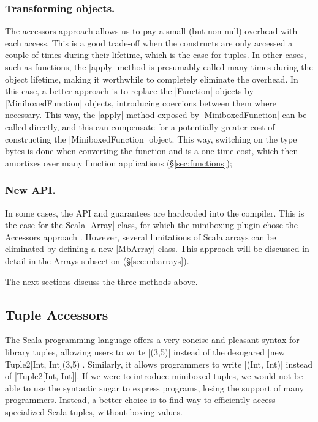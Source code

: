 \subsubsection{Transforming objects.} The accessors approach allows us to pay a small (but non-null) overhead with each access. This is a good trade-off when the constructs are only accessed a couple of times during their lifetime, which is the case for tuples. In other cases, such as functions, the |apply| method is presumably called many times during the object lifetime, making it worthwhile to completely eliminate the overhead. In this case, a better approach is to replace the |Function| objects by |MiniboxedFunction| objects, introducing coercions between them where necessary. This way, the |apply| method exposed by |MiniboxedFunction| can be called directly, and this can compensate for a potentially greater cost of constructing the |MiniboxedFunction| object. This way, switching on the type bytes is done when converting the function and is a one-time cost, which then amortizes over many function applications (\S\ref{sec:functions});

\subsubsection{New API.} In some cases, the API and guarantees are hardcoded into the compiler. This is the case for the Scala |Array| class, for which the miniboxing plugin chose the Accessors approach \cite{miniboxing}. However, several limitations of Scala arrays can be eliminated by defining a new |MbArray| class. This approach will be discussed in detail in the Arrays subsection (\S\ref{sec:mbarrays}).

The next sections discuss the three methods above.

\subsection{Tuple Accessors}
\label{sec:tuples}

The Scala programming language offers a very concise and pleasant syntax for library tuples, allowing users to write |(3,5)| instead of the desugared |new Tuple2[Int, Int](3,5)|. Similarly, it allows programmers to write |(Int, Int)| instead of |Tuple2[Int, Int]|. If we were to introduce miniboxed tuples, we would not be able to use the syntactic sugar to express programs, losing the support of many programmers. Instead, a better choice is to find way to efficiently access specialized Scala tuples, without boxing values.

